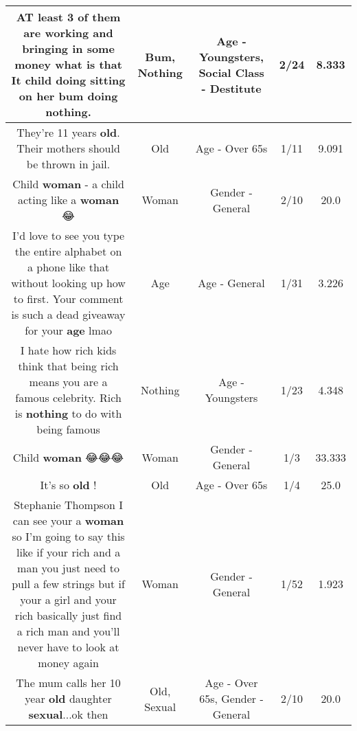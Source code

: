 \documentclass[11pt]{article}
\newlength\mylength
\begin{document}
\begin{center}
\begin{longtable}{|C{.65\mylength}|C{.30\mylength}|C{.12\mylength}|C{.12\mylength}|C{.12\mylength}|}
  \small AT least 3 of them are working and bringing in some money what is that It child doing sitting on her \textbf{bum} doing \textbf{nothing}.\normalsize   & Bum, Nothing & Age - Youngsters, Social Class - Destitute & 2/24 & 8.333 \\  \hline
  \small They're 11 years \textbf{old}. Their mothers should be thrown in jail.\normalsize   & Old & Age - Over 65s & 1/11 & 9.091 \\  \hline
  \small Child \textbf{woman} - a child acting like a \textbf{woman} 😂\normalsize   & Woman & Gender - General & 2/10 & 20.0 \\  \hline
  \small I'd love to see you type the entire alphabet on a phone like that without looking up how to first. Your comment is such a dead giveaway for your \textbf{age} lmao\normalsize   & Age & Age - General & 1/31 & 3.226 \\  \hline
  \small I hate how rich kids think that being rich means you are a famous celebrity. Rich is \textbf{nothing} to do with being famous\normalsize   & Nothing & Age - Youngsters & 1/23 & 4.348 \\  \hline
  \small Child \textbf{woman} 😂😂😂\normalsize   & Woman & Gender - General & 1/3 & 33.333 \\  \hline
  \small It's so \textbf{old} !\normalsize   & Old & Age - Over 65s & 1/4 & 25.0 \\  \hline
  \small Stephanie Thompson I can see your a \textbf{woman} so I'm going to say this like if your rich and a man you just need to pull a few strings but if your a girl and your rich basically just find a rich man and you'll never have to look at money again\normalsize   & Woman & Gender - General & 1/52 & 1.923 \\  \hline
  \small The mum calls her 10 year \textbf{old} daughter \textbf{sexual}...ok then\normalsize   & Old, Sexual & Age - Over 65s, Gender - General & 2/10 & 20.0 \\  \hline

\end{longtable}
\end{center}
\end{document}
